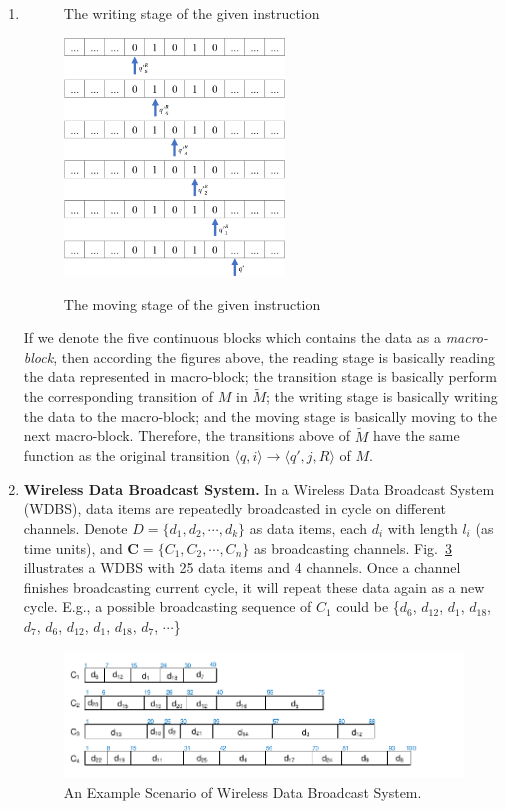 \documentclass[12pt,a4paper]{article}
\makeatletter
\newtheorem*{solution}{Solution}
\theoremstyle{definition}
\renewenvironment{solution}[1][Solution] {\par\pushQED{\qed}\normalfont\topsep6\p@\@plus6\p@\relax\trivlist\item[\hskip\labelsep\bfseries#1\@addpunct{.}]\ignorespaces}{\popQED\endtrivlist\@endpefalse} \makeatother
\makeatother
\begin{document}
\begin{enumerate}
\begin{solution}
\begin{figure}[htbp]
  \caption{The writing stage of the given instruction}\label{fig6}
\end{figure}
\begin{figure}[htbp]
  \centering
  \includegraphics[width=2.3in]{moving-stage.png}\\
  \caption{The moving stage of the given instruction}\label{fig7}
\end{figure}

If we denote the five continuous blocks which contains the data as a \textit{macro-block}, then according the figures above, the reading stage is basically reading the data represented in macro-block; the transition stage is basically perform the corresponding transition of $M$ in $\tilde{M}$; the writing stage is basically writing the data to the macro-block; and the moving stage is basically moving to the next macro-block. Therefore, the transitions above of $\tilde{M}$ have the same function as the original transition $\langle q, i \rangle \rightarrow \langle q',j, R\rangle$ of $M$.
\end{solution}
\clearpage

\item \textbf{Wireless Data Broadcast System.}
In a Wireless Data Broadcast System (WDBS), data items are repeatedly broadcasted in cycle on different channels. Denote $D = \{d_1, d_2,\cdots, d_k\}$ as data items, each $d_i$ with length $l_i$ (as time units), and $\mathbf{C}=\{C_1, C_2, \cdots, C_n\}$ as broadcasting channels. Fig.~\ref{Fig-Broadcast} illustrates a WDBS with 25 data items and 4 channels. Once a channel finishes broadcasting current cycle, it will repeat these data again as a new cycle. E.g., a possible broadcasting sequence of $C_1$ could be \{$d_6$, $d_{12}$, $d_1$, $d_{18}$, $d_7$, $d_6$, $d_{12}$, $d_1$, $d_{18}$, $d_7$, $\cdots$\}

\begin{figure}[h]
	\centering
	\includegraphics[scale=1]{Fig-Broadcast.pdf}
	\caption{An Example Scenario of Wireless Data Broadcast System.} \label{Fig-Broadcast}
\end{figure}


\end{enumerate}
\end{document}
